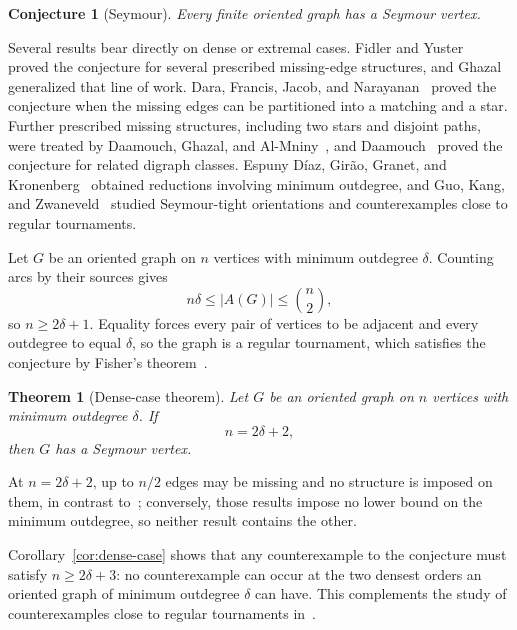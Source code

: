 \documentclass[12pt]{article}
\theoremstyle{plainsl}
\newtheorem{theorem}{Theorem}[section]
\newtheorem*{conjecture}{Conjecture}
\theoremstyle{remark}
\begin{document}
\begin{conjecture}[Seymour]
Every finite oriented graph has a Seymour vertex.
\end{conjecture}

Several results bear directly on dense or extremal cases.  Fidler and
Yuster~\cite{FidlerYuster2007} proved the conjecture for several prescribed
missing-edge structures, and Ghazal~\cite{Ghazal2012} generalized that line of
work.  Dara, Francis, Jacob, and
Narayanan~\cite{DaraFrancisJacobNarayanan2022} proved the conjecture when the
missing edges can be partitioned into a matching and a star.  Further
prescribed missing structures, including two stars and disjoint paths, were
treated by Daamouch, Ghazal, and
Al-Mniny~\cite{DaamouchGhazalAlMniny2024}, and Daamouch~\cite{Daamouch2021}
proved the conjecture for related digraph classes.  Espuny D\'iaz, Gir\~ao,
Granet, and Kronenberg~\cite{EspunyDiazEtAl2024} obtained reductions involving
minimum outdegree, and Guo, Kang, and Zwaneveld~\cite{GuoKangZwaneveld2026}
studied Seymour-tight orientations and counterexamples close to regular
tournaments.

Let $G$ be an oriented graph on $n$ vertices with minimum outdegree $\delta$. Counting arcs by their sources gives
\[
 n\delta\le|A(G)|\le\binom n2,
\]
so $n\ge2\delta+1$. Equality forces every pair of vertices to be adjacent and every outdegree to equal $\delta$, so the graph is a regular tournament, which satisfies the conjecture by Fisher's theorem~\cite{Fisher1996}.


\begin{theorem}[Dense-case theorem]\label{thm:fixed-target}
Let $G$ be an oriented graph on $n$ vertices with minimum outdegree $\delta$.
If
\[
 n=2\delta+2,
\]
then $G$ has a Seymour vertex.
\end{theorem}

At $n=2\delta+2$, up to $n/2$ edges may be missing and no structure is
imposed on them, in contrast
to~\cite{Daamouch2021,DaamouchGhazalAlMniny2024,DaraFrancisJacobNarayanan2022,FidlerYuster2007,Ghazal2012};
conversely, those results impose no lower bound on the minimum outdegree, so
neither result contains the other.

Corollary~\ref{cor:dense-case} shows that any counterexample to the
conjecture must satisfy $n\ge2\delta+3$: no counterexample can occur at the
two densest orders an oriented graph of minimum outdegree $\delta$ can have.
This complements the study of counterexamples close to regular tournaments
in~\cite{GuoKangZwaneveld2026}.
\end{document}
